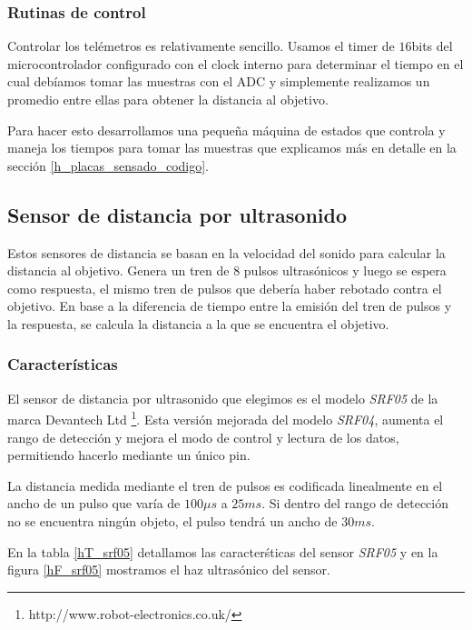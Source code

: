 \subsubsection{Rutinas de control}
\label{h_sensado_telemetros_rutinas}

Controlar los tel\'emetros es relativamente sencillo.
Usamos el timer de $16$bits del microcontrolador configurado con el clock interno para determinar el tiempo en el cual
deb\'iamos tomar las muestras con el ADC y simplemente realizamos un promedio entre ellas para obtener la distancia al objetivo.

Para hacer esto desarrollamos una peque\~na m\'aquina de estados que controla y maneja los tiempos para tomar las muestras que
explicamos m\'as en detalle en la secci\'on \ref{h_placas_sensado_codigo}.

\subsection{Sensor de distancia por ultrasonido}
\label{h_sensado_ultrasonido}

Estos sensores de distancia se basan en la velocidad del sonido para calcular la distancia al objetivo.
Genera un tren de $8$ pulsos ultras\'onicos y luego se espera como respuesta, el mismo tren de pulsos que deber\'ia haber rebotado contra el objetivo.
En base a la diferencia de tiempo entre la emisi\'on del tren de pulsos y la respuesta, se calcula la distancia a la que se encuentra el objetivo.

\subsubsection{Caracter\'isticas}
\label{h_sensado_ultrasonido_caracteristicas}

El sensor de distancia por ultrasonido que elegimos es el modelo \emph{SRF05} de la marca Devantech Ltd \footnote{http://www.robot-electronics.co.uk/}.
Esta versi\'on mejorada del modelo \emph{SRF04}, aumenta el rango de detecci\'on y mejora el modo de control y lectura de los datos, permitiendo
hacerlo mediante un \'unico pin.

La distancia medida mediante el tren de pulsos es codificada linealmente en el ancho de un pulso que var\'ia de $100\mu s$ a $25 ms$.
Si dentro del rango de detecci\'on no se encuentra ning\'un objeto, el pulso tendr\'a un ancho de $30ms$.

En la tabla \ref{hT_srf05} detallamos las caracter\'sticas del sensor \emph{SRF05} y en la figura \ref{hF_srf05} mostramos el haz ultras\'onico
del sensor.

